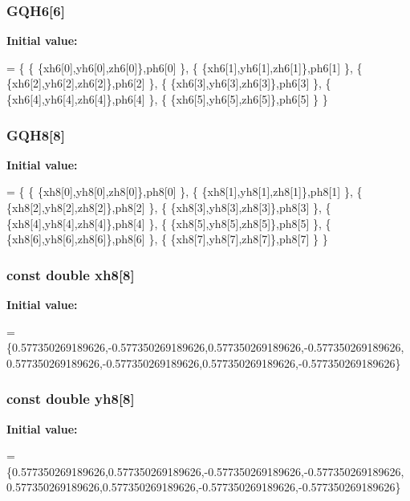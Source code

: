 \subsubsection[{G\-Q\-H6}]{ G\-Q\-H6[6]}\label{GaussQuadratureHex_8cc_a5591874e19df02f65a49de786aeef7b9}
{\bfseries Initial value\-:}
\begin{DoxyCode}
= 
\{
  \{ \{xh6[0],yh6[0],zh6[0]\},ph6[0] \},
  \{ \{xh6[1],yh6[1],zh6[1]\},ph6[1] \},
  \{ \{xh6[2],yh6[2],zh6[2]\},ph6[2] \},
  \{ \{xh6[3],yh6[3],zh6[3]\},ph6[3] \},
  \{ \{xh6[4],yh6[4],zh6[4]\},ph6[4] \},
  \{ \{xh6[5],yh6[5],zh6[5]\},ph6[5] \}
\}
\end{DoxyCode}
\subsubsection[{G\-Q\-H8}]{ G\-Q\-H8[8]}\label{GaussQuadratureHex_8cc_a1879071dc858aea5020b87d647f5117b}
{\bfseries Initial value\-:}
\begin{DoxyCode}
= 
\{
  \{ \{xh8[0],yh8[0],zh8[0]\},ph8[0] \},
  \{ \{xh8[1],yh8[1],zh8[1]\},ph8[1] \},
  \{ \{xh8[2],yh8[2],zh8[2]\},ph8[2] \},
  \{ \{xh8[3],yh8[3],zh8[3]\},ph8[3] \},
  \{ \{xh8[4],yh8[4],zh8[4]\},ph8[4] \},
  \{ \{xh8[5],yh8[5],zh8[5]\},ph8[5] \},
  \{ \{xh8[6],yh8[6],zh8[6]\},ph8[6] \},
  \{ \{xh8[7],yh8[7],zh8[7]\},ph8[7] \}
\}
\end{DoxyCode}
\subsubsection[{xh8}]{\setlength{\rightskip}{0pt plus 5cm}const double xh8[8]}\label{GaussQuadratureHex_8cc_a4289b8bac87184199ce0c78a8574f78b}
{\bfseries Initial value\-:}
\begin{DoxyCode}
= \{0.577350269189626,-0.577350269189626,0.577350269189626,-0.577350269189626,
                   0.577350269189626,-0.577350269189626,0.577350269189626,-0.577350269189626\}
\end{DoxyCode}
\subsubsection[{yh8}]{\setlength{\rightskip}{0pt plus 5cm}const double yh8[8]}\label{GaussQuadratureHex_8cc_aa15093310446c8d9f2a1786a42ed01e1}
{\bfseries Initial value\-:}
\begin{DoxyCode}
= \{0.577350269189626,0.577350269189626,-0.577350269189626,-0.577350269189626,
                   0.577350269189626,0.577350269189626,-0.577350269189626,-0.577350269189626\}
\end{DoxyCode}

